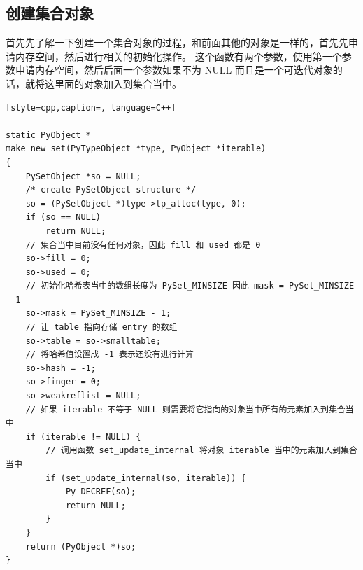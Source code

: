 \subsection{创建集合对象}
首先先了解一下创建一个集合对象的过程，和前面其他的对象是一样的，首先先申请内存空间，然后进行相关的初始化操作。
这个函数有两个参数，使用第一个参数申请内存空间，然后后面一个参数如果不为 NULL 而且是一个可迭代对象的话，就将这里面的对象加入到集合当中。
\begin{lstlisting}[style=cpp,caption=, language=C++]

static PyObject *
make_new_set(PyTypeObject *type, PyObject *iterable)
{
    PySetObject *so = NULL;
    /* create PySetObject structure */
    so = (PySetObject *)type->tp_alloc(type, 0);
    if (so == NULL)
        return NULL;
    // 集合当中目前没有任何对象，因此 fill 和 used 都是 0
    so->fill = 0;
    so->used = 0;
    // 初始化哈希表当中的数组长度为 PySet_MINSIZE 因此 mask = PySet_MINSIZE - 1
    so->mask = PySet_MINSIZE - 1;
    // 让 table 指向存储 entry 的数组
    so->table = so->smalltable;
    // 将哈希值设置成 -1 表示还没有进行计算
    so->hash = -1;
    so->finger = 0;
    so->weakreflist = NULL;
    // 如果 iterable 不等于 NULL 则需要将它指向的对象当中所有的元素加入到集合当中
    if (iterable != NULL) {
        // 调用函数 set_update_internal 将对象 iterable 当中的元素加入到集合当中
        if (set_update_internal(so, iterable)) {
            Py_DECREF(so);
            return NULL;
        }
    }
    return (PyObject *)so;
}
\end{lstlisting}
